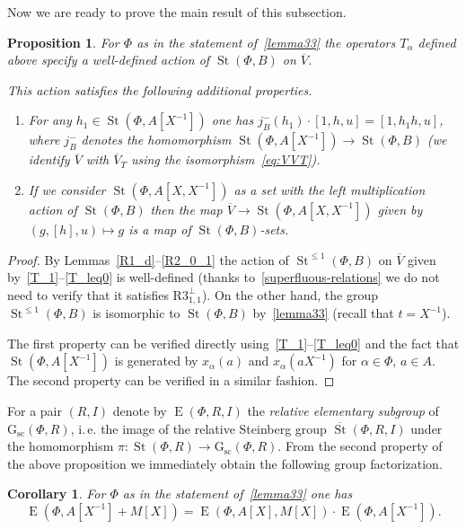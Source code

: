 \documentclass[10pt,a4paper,twoside]{article}
\newtheorem{prop}[lemma]{Proposition}
\newtheorem{corollary}[lemma]{Corollary}
\theoremstyle{remark}
\theoremstyle{definition}
\numberwithin{lemma}{section}
\numberwithin{prop}{section}
\numberwithin{corollary}{section}
\numberwithin{externaltheorem}{section}
\DeclareMathOperator{\St}{St}
\DeclareMathOperator{\E}{E}
\newcommand{\inv}{^{-1}}
\newcommand{\GG}{\mathrm{G}_{\mathrm{sc}}}
\numberwithin{equation}{section}
\begin{document}
Now we are ready to prove the main result of this subsection.
\begin{prop} \label{prop43}
For $\Phi$ as in the statement of~\cref{lemma33} the operators $T_\alpha$ defined above specify a well-defined action of $\St(\Phi, B)$ on $\overline{V}$. 

This action satisfies the following additional properties.
\begin{enumerate}
 \item For any $h_1 \in \St(\Phi, A[X\inv])$ one has $j_B^-(h_1) \cdot [1, h, u] = [1, h_1 h, u]$, where $j_B^-$ denotes the homomorphism $\St(\Phi, A[X\inv]) \to \St(\Phi, B)$ (we identify $\overline{V}$ with $\overline{V}_T$ using the isomorphism~\eqref{eq:VVT}).
 \item If we consider $\St(\Phi, A[X, X\inv])$ as a set with the left multiplication action of $\St(\Phi, B)$ then the map $\overline{V} \to \St(\Phi, A[X, X\inv])$ given by $(g, [h], u) \mapsto g$ is a map of $\St(\Phi, B)$-sets.
\end{enumerate}
\end{prop}
\begin{proof} By Lemmas~\ref{R1_d}--\ref{R2_0_1} the action of $\St^{\leq 1}(\Phi, B)$ on $\overline{V}$ given by~\eqref{T_1}--\eqref{T_leq0} is well-defined (thanks to~\cref{superfluous-relations} we do not need to verify that it satisfies $\text{R3}_{1,1}^\bot$). On the other hand, the group $\St^{\leq 1}(\Phi, B)$ is isomorphic to $\St(\Phi, B)$ by~\cref{lemma33} (recall that $t = X^{-1}$).
  
The first property can be verified directly using~\eqref{T_1}--\eqref{T_leq0} and the fact that $\St(\Phi, A[X\inv])$ is generated by $x_\alpha(a)$ and $x_\alpha(aX\inv)$ for $\alpha\in\Phi$, $a\in A$. The second property can be verified in a similar fashion. \end{proof}

For a pair $(R, I)$ denote by $\E(\Phi, R, I)$ the {\it relative elementary subgroup} of $\GG(\Phi, R)$, i.\,e.
the image of the relative Steinberg group $\overline{\St}(\Phi, R, I)$ under the homomorphism $\pi \colon \St(\Phi, R) \to \GG(\Phi, R)$.
From the second property of the above proposition we immediately obtain the following group factorization.
\begin{corollary} For $\Phi$ as in the statement of~\cref{lemma33} one has
\[\E(\Phi, A[X\inv] + M[X]) = \E(\Phi, A[X], M[X]) \cdot \E(\Phi, A[X\inv]).\] \end{corollary}
\end{document}
